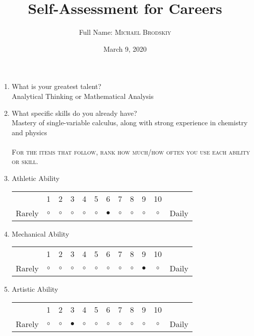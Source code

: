 \documentclass{article}
\title{Self-Assessment for Careers}
\author{Full Name: \textsc{Michael Brodskiy}}
\date{March 9, 2020}
\begin{document}
\maketitle

\begin{enumerate}
    
\item What is your greatest talent?\\
\vspace{2pt}
Analytical Thinking or Mathematical Analysis
\vspace{7pt}
\item What specific skills do you already have?\\
\vspace{2pt}
Mastery of single-variable calculus, along with strong experience in chemistry and physics\\
\vspace{10pt}\\
\textsc{For the items that follow, rank how much/how often you use each ability or skill.}\\
\vspace{5pt}

\item Athletic Ability\\
\vspace{5pt}
\begin{tabular}{c c c c c c c c c c c c}
     & 1 & 2 & 3 & 4 & 5 & 6 & 7 & 8 & 9 & 10 & \\
    Rarely & $\circ$ & $\circ$ & $\circ$ & $\circ$ & $\circ$ & $\bullet$ & $\circ$ & $\circ$ & $\circ$ & $\circ$ & Daily \\ 
\end{tabular}

\item Mechanical Ability \\
\vspace{5pt}
\begin{tabular}{c c c c c c c c c c c c}
     & 1 & 2 & 3 & 4 & 5 & 6 & 7 & 8 & 9 & 10 & \\
    Rarely & $\circ$ & $\circ$ & $\circ$ & $\circ$ & $\circ$ & $\circ$ & $\circ$ & $\circ$ & $\bullet$ & $\circ$ & Daily \\ 
\end{tabular}

\item Artistic Ability\\
\vspace{5pt}
\begin{tabular}{c c c c c c c c c c c c}
     & 1 & 2 & 3 & 4 & 5 & 6 & 7 & 8 & 9 & 10 & \\
    Rarely & $\circ$ & $\circ$ & $\bullet$ & $\circ$ & $\circ$ & $\circ$ & $\circ$ & $\circ$ & $\circ$ & $\circ$ & Daily \\ 
\end{tabular}


\end{enumerate}
\end{document}
